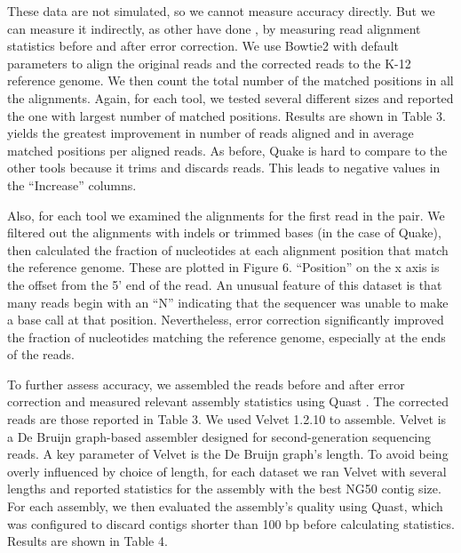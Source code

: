 \documentclass{bmcart}
\begin{document}
 
These data are not simulated, so we cannot measure accuracy directly.  But we can measure it indirectly, as other have done \cite{heo2014bless}, by measuring read alignment statistics before and after error correction.  We use Bowtie2 \cite{langmead2012fast} with default parameters to align the original reads and the corrected reads to the \ecoli K-12 reference genome.  We then count the total number of the matched positions in all the alignments. Again, for each tool, we tested several different \kmer sizes and reported the one with largest number of matched positions. Results are shown in Table 3.  \tool yields the greatest improvement in number of reads aligned and in average matched positions per aligned reads.  As before, Quake is hard to compare to the other tools because it trims and discards reads.  This leads to negative values in the ``Increase'' columns.



Also, for each tool we examined the alignments for the first read in the pair.  We filtered out the alignments with indels or trimmed bases (in the case of Quake), then calculated the fraction of nucleotides at each alignment position that match the reference genome.  These are plotted in Figure 6. ``Position'' on the x axis is the offset from the 5' end of the read.  An unusual feature of this dataset is that many reads begin with an ``N'' indicating that the sequencer was unable to make a base call at that position. Nevertheless, error correction significantly improved the fraction of nucleotides matching the reference genome, especially at the ends of the reads.



To further assess accuracy, we assembled the reads before and after error correction and measured relevant assembly statistics using Quast \cite{gurevich2013quast}.  The corrected reads are those reported in Table 3. We used Velvet 1.2.10\cite{zerbino2008velvet} to assemble.  Velvet is a De Bruijn graph-based assembler designed for second-generation sequencing reads.  A key parameter of Velvet is the De Bruijn graph's \kmer length.  To avoid being overly influenced by choice of \kmer length, for each dataset we ran Velvet with several \kmer lengths and reported statistics for the assembly with the best NG50 contig size.  For each assembly, we then evaluated the assembly's quality using Quast, which was configured to discard contigs shorter than 100 bp before calculating statistics. Results are shown in Table 4.
\end{document}
